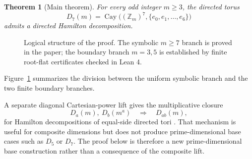 \documentclass[11pt]{article}
\newtheorem{theorem}{Theorem}
\theoremstyle{definition}
\newcommand{\Cay}{\operatorname{Cay}}
\begin{document}
\begin{theorem}[Main theorem]\label{thm:main}
For every odd integer \(m\ge3\), the directed torus
\[
D_7(m)=\Cay\bigl((\mathbb Z_m)^7,\{e_0,e_1,\ldots,e_6\}\bigr)
\]
admits a directed Hamilton decomposition.
\end{theorem}

\begin{figure}[t]
\centering
{}
\caption{Logical structure of the proof. The symbolic \(m\ge7\) branch is proved in the paper; the boundary branch \(m=3,5\) is established by finite root-flat certificates checked in Lean 4.}
\label{fig:proof-overview}
\end{figure}

Figure~\ref{fig:proof-overview} summarizes the division between the uniform symbolic branch and the two finite boundary branches.

A separate diagonal Cartesian-power lift gives the multiplicative closure
\[
D_a(m),\ D_b(m^a)\quad\Longrightarrow\quad D_{ab}(m),
\]
for Hamilton decompositions of equal-side directed tori \cite{ParkComposite}.  That mechanism is
useful for composite dimensions but does not produce prime-dimensional base cases such as
\(D_5\) or \(D_7\).  The proof below is therefore a new prime-dimensional base construction rather
than a consequence of the composite lift.
\end{document}

